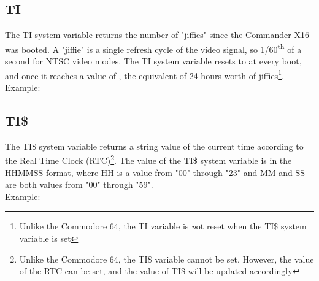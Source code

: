 \vspace{16pt}

\subsection{TI}

The {\ttfamily TI} system variable returns the number of "jiffies" since the
Commander X16 was booted.  A "jiffie" is a single refresh cycle of the video
signal, so 1/60\textsuperscript{th} of a second for NTSC video modes.  The
{\ttfamily TI} system variable resets to {} at every boot, and once
it reaches a value of {}, the equivalent of 24 hours worth of
jiffies\footnote{Unlike the Commodore 64, the {\ttfamily TI} variable is {\emph
not} reset when the {\ttfamily TI\$} system variable is set}.\\

Example:\\


\subsection{TI\$}

The {\ttfamily TI\$} system variable returns a string value of the current time
according to the Real Time Clock (RTC)\footnote{Unlike the Commodore 64, the
{\ttfamily TI\$} variable cannot be set.  However, the value of the RTC can be
set, and the value of {\ttfamily TI\$} will be updated accordingly}.  The value
of the {\ttfamily TI\$} system variable is in the HHMMSS format, where HH is a
value from "00" through "23" and MM and SS are both values from "00" through
"59".\\

Example:\\


